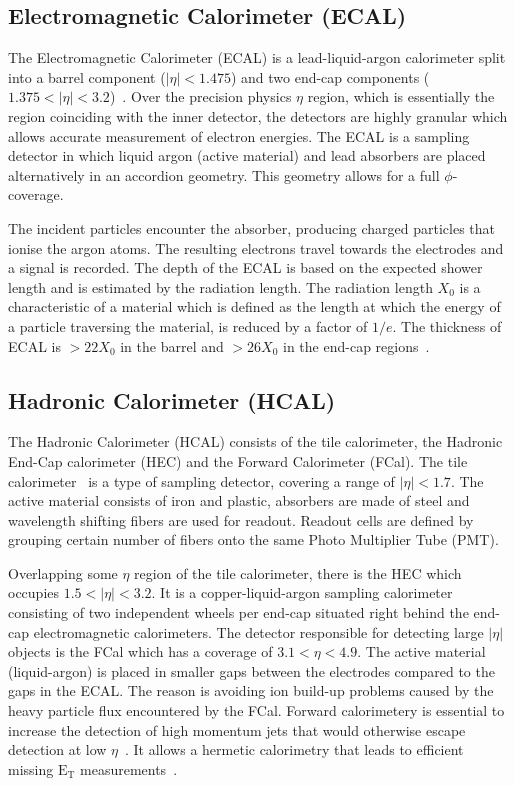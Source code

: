 \subsection*{Electromagnetic Calorimeter (ECAL)}
The Electromagnetic Calorimeter (ECAL) is a lead-liquid-argon calorimeter split into a 
barrel component ($|\eta|<1.475$) and two end-cap components 
($1.375 < |\eta| < 3.2$)~\cite{PERF-2007-01}. Over the precision physics 
$\eta$ region, which is essentially the region coinciding with the inner detector, the 
detectors are highly granular which allows accurate measurement of electron energies.
The ECAL is a sampling detector in which liquid argon (active material) and lead absorbers are placed 
alternatively in an accordion geometry. This geometry allows for a full 
$\phi$-coverage. 

The incident particles encounter the absorber, producing charged particles that ionise the argon atoms. The resulting electrons travel towards the electrodes and a
signal is recorded. The depth of the ECAL is based on the expected shower length and is estimated
by the radiation length. The radiation length $X_0$ is a characteristic of a material which is defined as 
the length at which the energy of a particle traversing the material, is reduced by a factor of $1/e$. The thickness of ECAL is $> 22 X_0$ in the barrel and $> 26 X_0$ in the end-cap
regions~\cite{CERN-LHCC-2017-018}.

\subsection*{Hadronic Calorimeter (HCAL)}
The Hadronic Calorimeter (HCAL) consists of the tile calorimeter, the Hadronic End-Cap calorimeter (HEC)
and the Forward Calorimeter (FCal). The tile calorimeter~\cite{Francavilla_2012} is a type of sampling
detector, covering a range of $|\eta|<1.7$. The active material consists of iron and plastic, 
absorbers are made of steel and wavelength shifting fibers are used for readout.
Readout cells are defined by grouping certain number of fibers onto the same Photo Multiplier 
Tube (PMT). 

Overlapping some $\eta$ region of the tile calorimeter, there is the HEC which occupies
$1.5 < |\eta| < 3.2$. It is a copper-liquid-argon sampling calorimeter consisting of two independent wheels per end-cap situated right behind the end-cap electromagnetic
calorimeters. The detector responsible for detecting large $|\eta|$ objects is the FCal which has a coverage of $3.1 < \eta < 4.9$. The active material (liquid-argon) is 
placed in smaller gaps between the electrodes compared to the gaps in the ECAL. The reason is avoiding
ion build-up problems caused by the heavy particle flux 
encountered by the FCal. Forward calorimetery is essential to increase the detection of high momentum jets that would otherwise escape detection at low 
$\eta$~\cite{J-P-Archambault_2008}. It allows a hermetic calorimetry that leads to efficient missing
$\text{E}_\text{T}$ measurements~\cite{A-Artamonov_2008}.
 

